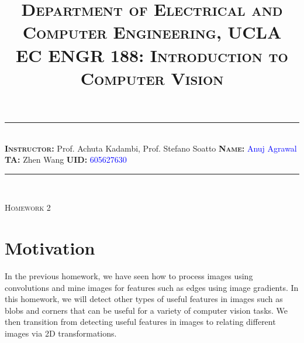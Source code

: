 \documentclass[answers]{exam}
\title{\normalfont \normalsize
\textsc{{Department of Electrical and Computer Engineering, UCLA \\
EC ENGR 188: Introduction to Computer Vision}}
\date{\vspace{-12ex}}
}
\newcommand{\myinput}[1]{\textcolor{blue}{#1}}
\begin{document}
\maketitle
\rule{\linewidth}{0.8pt} \\[6pt] 
\noindent
\large\textbf{\textsc{Instructor:}} Prof. Achuta Kadambi, Prof. Stefano Soatto \hfill \large\textbf{\textsc{Name:}} \myinput{Anuj Agrawal}\\
\large\textbf{\textsc{TA:}} Zhen Wang \hfill 
\large\textbf{\textsc{UID:}} \myinput{605627630}
\rule{\linewidth}{0.8pt} \\[6pt] 

\begin{center}
{\textsc{Homework 2}} 
\end{center}


\begin{table}[h]
\centering
{}
\caption*{}
\label{}
\end{table}

\newpage

\section*{Motivation}

In the previous homework, we have seen how to process images using convolutions and mine images for features such as edges using image gradients. In this homework, we will detect other types of useful features in images such as blobs and corners that can be useful for a variety of computer vision tasks. We then transition from detecting useful features in images to relating different images via 2D transformations.
\end{document}

